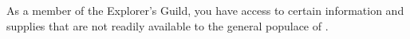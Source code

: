 \documentclass[blue]{NeptuneBall}
\begin{document}
\name{\bExplorer{}}

As a member of the Explorer's Guild, you have access to certain information and supplies that are not readily available to the general populace of \pAtlantis{}.
\end{document}
